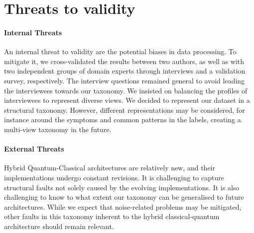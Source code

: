 \section{Threats to validity}
\label{threats to validity}
\paragraph{Internal Threats} 
An internal threat to validity are the potential biases in data processing. To mitigate it, we cross-validated the results between two authors, as well as with two independent groups of domain experts through interviews and a validation survey, respectively. The interview questions remained general to avoid leading the interviewees towards our taxonomy. We insisted on balancing the profiles of interviewees to represent diverse views. We decided to represent our dataset in a structural taxonomy. However, different representations may be considered, for instance around the symptoms and common patterns in the labels, creating a multi-view taxonomy in the future. 

\paragraph{External Threats}
Hybrid Quantum-Classical architectures are relatively new, and their  implementations undergo constant revisions. It is challenging to capture structural faults not solely caused by the evolving  implementations. It is also challenging to know to what extent our taxonomy can be generalised to future architectures. While we expect that noise-related problems  may be mitigated, other faults in this taxonomy inherent to the hybrid classical-quantum architecture should remain relevant.

